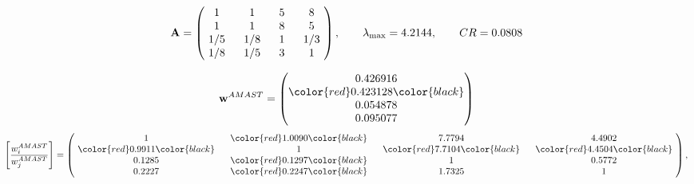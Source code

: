 \begin{example}
\begin{equation*}
\mathbf{A} =
\begin{pmatrix}
$\,\,$ 1 $\,\,$ & $\,\,$1$\,\,$ & $\,\,$5$\,\,$ & $\,\,$8 $\,\,$ \\
$\,\,$ 1 $\,\,$ & $\,\,$ 1 $\,\,$ & $\,\,$8$\,\,$ & $\,\,$5 $\,\,$ \\
$\,\,$ 1/5$\,\,$ & $\,\,$ 1/8$\,\,$ & $\,\,$ 1 $\,\,$ & $\,\,$ 1/3 $\,\,$ \\
$\,\,$ 1/8$\,\,$ & $\,\,$ 1/5$\,\,$ & $\,\,$3$\,\,$ & $\,\,$ 1  $\,\,$ \\
\end{pmatrix},
\qquad
\lambda_{\max} =
4.2144,
\qquad
CR = 0.0808
\end{equation*}

\begin{equation*}
\mathbf{w}^{AMAST} =
\begin{pmatrix}
0.426916\\
\color{red} 0.423128\color{black} \\
0.054878\\
0.095077
\end{pmatrix}\end{equation*}
\begin{equation*}
\left[ \frac{{w}^{AMAST}_i}{{w}^{AMAST}_j} \right] =
\begin{pmatrix}
$\,\,$ 1 $\,\,$ & $\,\,$\color{red} 1.0090\color{black} $\,\,$ & $\,\,$7.7794$\,\,$ & $\,\,$4.4902$\,\,$ \\
$\,\,$\color{red} 0.9911\color{black} $\,\,$ & $\,\,$ 1 $\,\,$ & $\,\,$\color{red} 7.7104\color{black} $\,\,$ & $\,\,$\color{red} 4.4504\color{black}   $\,\,$ \\
$\,\,$0.1285$\,\,$ & $\,\,$\color{red} 0.1297\color{black} $\,\,$ & $\,\,$ 1 $\,\,$ & $\,\,$0.5772 $\,\,$ \\
$\,\,$0.2227$\,\,$ & $\,\,$\color{red} 0.2247\color{black} $\,\,$ & $\,\,$1.7325$\,\,$ & $\,\,$ 1  $\,\,$ \\
\end{pmatrix},
\end{equation*}


\end{example}
